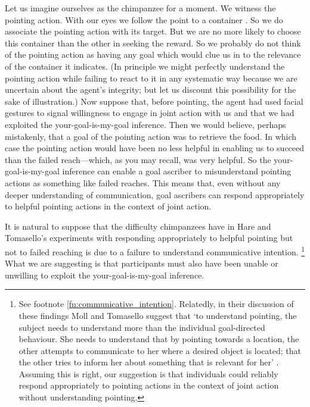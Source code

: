 \documentclass[12pt,\papersize]{extarticle}
\begin{document}
Let us imagine ourselves as the chimpanzee  for a moment.
We witness the pointing action.
With our eyes we follow the point to a container \citep[see][p.\ 6]{Moll:2007gu}.
So we do associate the pointing action with its target.
But we are no more likely to choose this container than the other in seeking the reward.
So we probably do not think of the pointing action as having any goal which would clue us in to the relevance of the container it indicates.
(In principle we might perfectly understand the pointing action while failing to react to it in any systematic way because we are uncertain about the agent's integrity; but let us discount this possibility for the sake of illustration.)
Now suppose 
that, 
before pointing, the agent had used facial gestures to signal willingness to engage in joint action with us
and 
that we had exploited the your-goal-is-my-goal inference.
Then we would believe,
perhaps mistakenly,
that a goal of the pointing action was to retrieve the food.
In which case the pointing action would have been no less helpful in enabling us to succeed than the failed reach---which, as you may recall, was very helpful.
So the your-goal-is-my-goal inference can 
enable a goal ascriber
to  
misunderstand pointing actions as something like  failed reaches.
This means that,
even without any deeper understanding of communication,
goal ascribers can respond appropriately to helpful pointing actions in the context of joint action.


It is natural to suppose that the difficulty chimpanzees have in Hare and Tomasello's experiments with responding appropriately to helpful pointing but not to failed reaching
is due to a failure to understand communicative intention.%
\footnote{
See  footnote \vref{fn:communicative_intention}.
Relatedly,
in their discussion of these findings
Moll and Tomasello suggest that
`to understand pointing, the subject needs to understand more than the individual goal-directed behaviour. 
She needs to understand that by pointing towards a location, the other attempts to communicate to her where a desired object is located; that the other tries to inform her about something that is relevant for her'
\citep[p.\ 6]{Moll:2007gu}.
Assuming this is right, our suggestion is that individuals could reliably  respond  appropriately to pointing actions in the context of joint action without understanding pointing.
}
What we are suggesting is that participants must also have been unable or unwilling to 
exploit the your-goal-is-my-goal inference.
\end{document}
